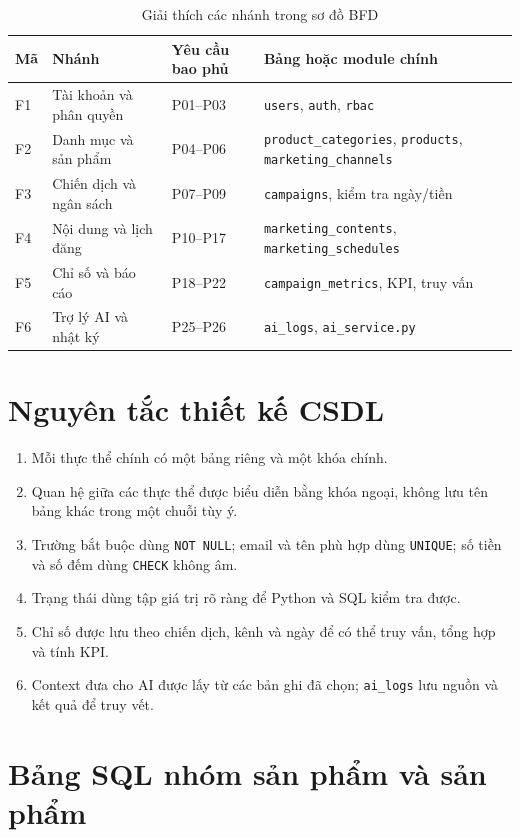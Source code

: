 \begin{table}[h!]
\centering
\small
\caption{Giải thích các nhánh trong sơ đồ BFD}
\begin{tabularx}{\textwidth}{|C{0.9cm}|L{4.2cm}|Y|Y|}
\hline
\textbf{Mã} & \textbf{Nhánh} & \textbf{Yêu cầu bao phủ} & \textbf{Bảng hoặc module chính}\\\hline
F1 & Tài khoản và phân quyền & P01--P03 & \texttt{users}, \texttt{auth}, \texttt{rbac}\\\hline
F2 & Danh mục và sản phẩm & P04--P06 & \texttt{product\_categories}, \texttt{products}, \texttt{marketing\_channels}\\\hline
F3 & Chiến dịch và ngân sách & P07--P09 & \texttt{campaigns}, kiểm tra ngày/tiền\\\hline
F4 & Nội dung và lịch đăng & P10--P17 & \texttt{marketing\_contents}, \texttt{marketing\_schedules}\\\hline
F5 & Chỉ số và báo cáo & P18--P22 & \texttt{campaign\_metrics}, KPI, truy vấn\\\hline
F6 & Trợ lý AI và nhật ký & P25--P26 & \texttt{ai\_logs}, \texttt{ai\_service.py}\\\hline
\end{tabularx}
\end{table}

\section{Nguyên tắc thiết kế CSDL}

\begin{enumerate}
  \item Mỗi thực thể chính có một bảng riêng và một khóa chính.
  \item Quan hệ giữa các thực thể được biểu diễn bằng khóa ngoại, không lưu tên bảng khác trong một chuỗi tùy ý.
  \item Trường bắt buộc dùng \texttt{NOT NULL}; email và tên phù hợp dùng \texttt{UNIQUE}; số tiền và số đếm dùng \texttt{CHECK} không âm.
  \item Trạng thái dùng tập giá trị rõ ràng để Python và SQL kiểm tra được.
  \item Chỉ số được lưu theo chiến dịch, kênh và ngày để có thể truy vấn, tổng hợp và tính KPI.
  \item Context đưa cho AI được lấy từ các bản ghi đã chọn; \texttt{ai\_logs} lưu nguồn và kết quả để truy vết.
\end{enumerate}

\section{Bảng SQL nhóm sản phẩm và sản phẩm}

